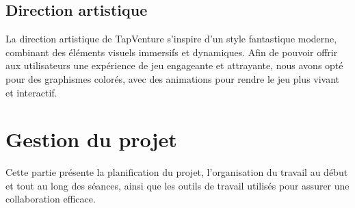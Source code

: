 \documentclass[11pt,a4paper]{article}
\begin{document}
\subsection{Direction artistique}
La direction artistique de TapVenture s'inspire d'un style fantastique moderne, combinant des éléments visuels immersifs et dynamiques. 
Afin de pouvoir offrir aux utilisateurs une expérience de jeu engageante et attrayante, nous avons opté pour des graphismes colorés, avec des animations pour rendre le jeu plus vivant et interactif.
\section{Gestion du projet}
Cette partie présente la planification du projet, l'organisation du travail au début et tout au long des séances, ainsi que les outils de travail utilisés pour assurer une collaboration efficace.
\end{document}
